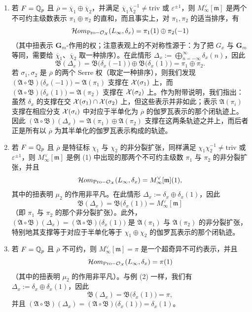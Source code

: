 \begin{enumerate}[(1)]
\item 若 $F=\mathbb{Q}_p$ 且 $\overline{\rho}=\overline{\chi}_1\oplus\overline{\chi}_2$，并满足 $\overline{\chi}_1\overline{\chi}_2^{-1}\neq\mathrm{triv}$ 或 $\varepsilon^{\pm1}$，则 $M_\infty^\vee[\mathfrak m]$ 是两个不可约主级数表示 $\pi_1\oplus\pi_2$ 的直和，而且事实上，对 $\pi_1,\pi_2$ 的适当排序，有
\[
\mathcal Hom_{\mathrm{Pro-}\mathcal{O}_{\mathcal{X}}}(L_\infty,\delta_x)=\pi_1(1)\oplus\pi_2(-1)
\]
（其中扭表示 $\mathbf G_m$-作用的权；注意表观上的不对称性源于：为了把 $G_x$ 与 $\mathbf G_m$ 等同，需要给 $\overline{\chi}_1$、$\overline{\chi}_2$ 取一种排序）。在此情形 $\Delta_x:=\bigoplus_{n=-\infty}^{\infty}\delta_x(n)$，因此
\[
\mathfrak B(\Delta_x)=\mathfrak B\bigl(\delta_x(-1)\bigr)\oplus\mathfrak B\bigl(\delta_x(1)\bigr)=\pi_1\oplus\pi_2.
\]
若 $\sigma_1,\sigma_2$ 是 $\overline{\rho}$ 的两个 Serre 权（取定一种排序），则我们发现 $(\mathfrak A\circ\mathfrak B)\bigl(\delta_x(-1)\bigr)=\mathfrak A(\pi_1)$ 支撑在 $\mathcal{X}(\sigma_1)$ 上，而 $(\mathfrak A\circ\mathfrak B)\bigl(\delta_x(1)\bigr)=\mathfrak A(\pi_2)$ 支撑在 $\mathcal{X}(\sigma_2)$ 上。作为附带说明，我们指出：虽然 $\delta_x$ 的支撑在交 $\mathcal{X}(\sigma_1)\cap\mathcal{X}(\sigma_2)$ 上，但这些表示并非如此；表示 $\mathfrak A(\pi_i)$ 支撑在相应分支 $\mathcal{X}(\sigma_i)$ 中对应于半单化为 $\overline{\rho}$ 的伽罗瓦表示的那个闭轨迹上。因此 $(\mathfrak A\circ\mathfrak B)(\Delta_x)=\mathfrak A(\pi_1)\oplus\mathfrak A(\pi_2)$ 支撑在这两条轨迹之并上，而后者正是所有以 $\overline{\rho}$ 为其半单化的伽罗瓦表示构成的轨迹。

\item 若 $F=\mathbb{Q}_p$ 且 $\overline{\rho}$ 是特征标 $\chi_1$ 与 $\chi_2$ 的非分裂扩张，同样满足 $\chi_1\chi_2^{-1}\neq\mathrm{triv}$ 或 $\varepsilon^{\pm1}$，则 $M_\infty^\vee[\mathfrak m]$ 是例 (1) 中出现的那两个不可约主级数 $\pi_1$ 与 $\pi_2$ 的非分裂扩张，并且
\[
\mathcal Hom_{\mathrm{Pro-}\mathcal{O}_{\mathcal{X}}}(L_\infty,\delta_x)=M_\infty^\vee[\mathfrak m](1),
\]
其中的扭表明 $\mu_2$ 的作用非平凡。在此情形 $\Delta_x:=\delta_x\oplus\delta_x(1)$，因此
\[
\mathfrak B(\Delta_x)=\mathfrak B\bigl(\delta_x(1)\bigr)=M_\infty^\vee[\mathfrak m]
\]
（即 $\pi_1$ 与 $\pi_2$ 的那个非分裂扩张）。此外，$(\mathfrak A\circ\mathfrak B)(\Delta_x)=(\mathfrak A\circ\mathfrak B)\bigl(\delta_x(1)\bigr)$ 是 $\mathfrak A(\pi_1)$ 与 $\mathfrak A(\pi_2)$ 的非分裂扩张，特别地其支撑等于对应于半单化等于 $\chi_1\oplus\chi_2$ 的伽罗瓦表示的那个闭轨迹。

\item 若 $F=\mathbb{Q}_p$ 且 $\overline{\rho}$ 不可约，则 $M_\infty^\vee[\mathfrak m]=\pi$ 是一个超奇异不可约表示，并且
\[
\mathcal Hom_{\mathrm{Pro-}\mathcal{O}_{\mathcal{X}}}(L_\infty,\delta_x)=\pi(1)
\]
（其中的扭表明 $\mu_2$ 的作用非平凡）。与例 (2) 一样，我们有 $\Delta_x:=\delta_x\oplus\delta_x(1)$，因此
\[
\mathfrak B(\Delta_x)=\mathfrak B\bigl(\delta_x(1)\bigr)=\pi,
\]
并且 $(\mathfrak A\circ\mathfrak B)(\Delta_x)=(\mathfrak A\circ\mathfrak B)\bigl(\delta_x(1)\bigr)=\delta_x(1)$。


\end{enumerate}
